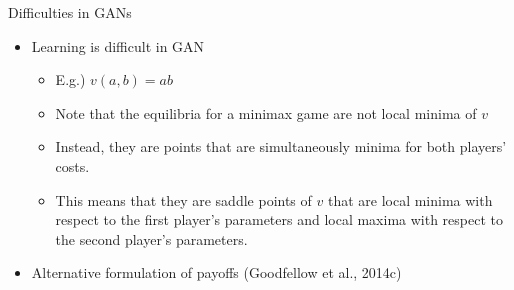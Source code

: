 \documentclass[dvipdfmx,presentation]{beamer}
\begin{document}
\begin{frame}[label={sec:orgheadline29}]{Difficulties in GANs}
\begin{itemize}
\item Learning is difficult in GAN
\begin{itemize}
\item E.g.) \(v(a, b) = a b\)
\item Note that the equilibria for a minimax game are not local minima of \(v\)
\item Instead, they are points that are simultaneously minima for both players' costs.
\item This means that they are saddle points of \(v\) that are local minima with respect to the first player's parameters and local maxima with respect to the second player's parameters.
\end{itemize}
\item Alternative formulation of payoffs (Goodfellow et al., 2014c)
\end{itemize}
\end{frame}
\end{document}
